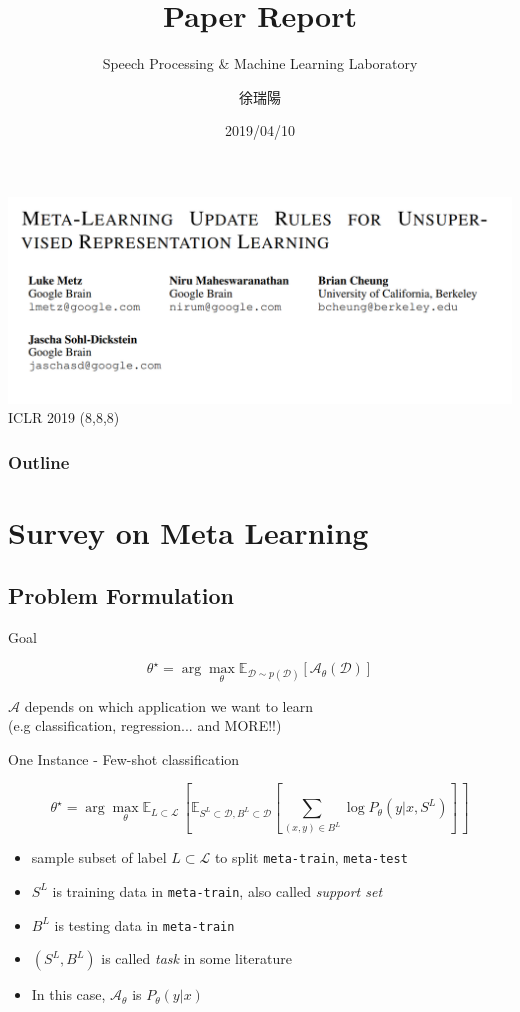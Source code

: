 \documentclass{beamer}
\title{Paper Report}
\subtitle{\textcolor[rgb]{0.00,0.50,1.00}{{Speech Processing \& Machine Learning Laboratory}}}
\author{徐瑞陽}
\date{2019/04/10}
\begin{document}
\begin{frame}
\maketitle
\end{frame}

\begin{frame}
  \includegraphics[width=\textwidth]{fig/title.png}
  \center ICLR 2019
  \center (8,8,8)
\end{frame}


\begin{frame}
\frametitle{Outline}
\tableofcontents
\end{frame}

\section{Survey on Meta Learning}
\subsection{Problem Formulation}
\begin{frame}{Goal}

\[ \theta^\star = \arg \max_\theta \mathbb{E}_{\mathcal{D} \sim p(\mathcal{D}) }[\mathcal{A}_\theta(\mathcal{D})]\]

$\mathcal{A}$ depends on which application we want to learn \\ 
(e.g classification, regression... and MORE!!)
\end{frame}

\begin{frame}{One Instance - Few-shot classification}

  \[ \theta^\star = \arg \max_\theta \mathbb{E}_{L \subset \mathcal{L}} \, [ \mathbb{E}_{S^L \subset \mathcal{D}, B^L \subset \mathcal{D}}[\sum_{(x,y) \in B^L} \log P_\theta(y|x,S^L)] \,  ]\]

  \begin{itemize}
    \item sample subset of label $L \subset \mathcal{L}$ to split \texttt{meta-train}, \texttt{meta-test}
    \item $S^L$ is training data in \texttt{meta-train}, also called \textit{support set}
    \item $B^L$ is testing data in \texttt{meta-train}
    \item $(S^L, B^L)$ is called \textit{task} in some literature
    \item In this case, $\mathcal{A}_\theta$ is $P_\theta(y|x)$
  \end{itemize}
\end{frame}
\end{document}
